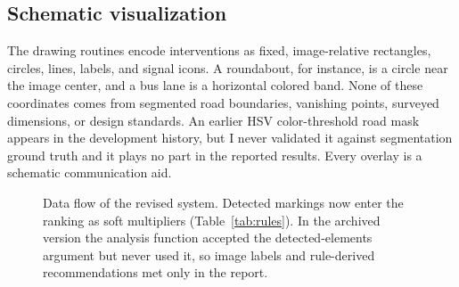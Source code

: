 \documentclass[11pt]{article}
\begin{document}
\subsection{Schematic visualization}
The drawing routines encode interventions as fixed, image-relative rectangles, circles, lines, labels, and signal icons. A roundabout, for instance, is a circle near the image center, and a bus lane is a horizontal colored band. None of these coordinates comes from segmented road boundaries, vanishing points, surveyed dimensions, or design standards. An earlier HSV color-threshold road mask appears in the development history, but I never validated it against segmentation ground truth and it plays no part in the reported results. Every overlay is a schematic communication aid.

\begin{figure}[htbp]
\centering
{}
\caption{Data flow of the revised system. Detected markings now enter the ranking as soft multipliers (Table~\ref{tab:rules}). In the archived version the analysis function accepted the detected-elements argument but never used it, so image labels and rule-derived recommendations met only in the report.}
\label{fig:dataflow}
\end{figure}
\end{document}
